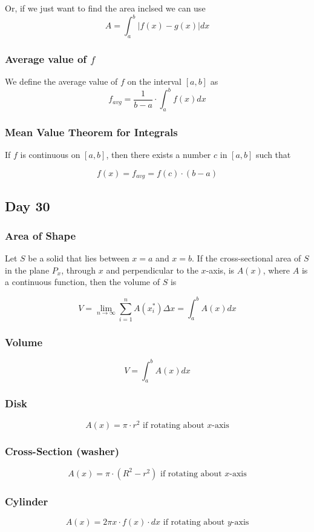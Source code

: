 \documentclass[12pt]{article}
\begin{document}
\noindent Or, if we just want to find the area inclsed we can use 
$$A = \int_a^b \left| f(x) - g(x) \right| dx$$


\subsubsection{Average value of $f$}
We define the average value of $f$ on the interval $[a,b]$ as 
$$f_{avg}= \frac{1}{b-a} \cdot \int_a^b f(x) dx$$

\subsubsection{Mean Value Theorem for Integrals} If $f$ is continuous on $[a,b]$, then there exists a number $c$ in $[a,b]$ such that 

$$f(x) = f_{avg} = f(c) \cdot (b-a)$$


\subsection{Day 30}
\subsubsection{Area of Shape} Let $S$ be a solid that lies between $x=a$ and $x=b$. If the cross-sectional area of $S$ in the plane $P_x$, through $x$ and perpendicular to the $x$-axis, is $A(x)$, where $A$ is a continuous function, then the volume of $S$ is 

$$V=\lim_{n \to \infty} \sum_{i=1}^{n} A(x_i^*) \Delta x = \int_a^b A(x) dx$$

\subsubsection{Volume}

$$V=\int_a^b A(x) dx$$

\subsubsection{Disk}

$$A(x) = \pi \cdot r^2 \text{ if rotating about $x$-axis}$$

\subsubsection{Cross-Section (washer)}

$$A(x) = \pi \cdot (R^2 - r^2)  \text{ if rotating about $x$-axis}$$

\subsubsection{Cylinder}

$$A(x) = 2\pi x \cdot f(x) \cdot dx \text{ if rotating about $y$-axis}$$
\end{document}
